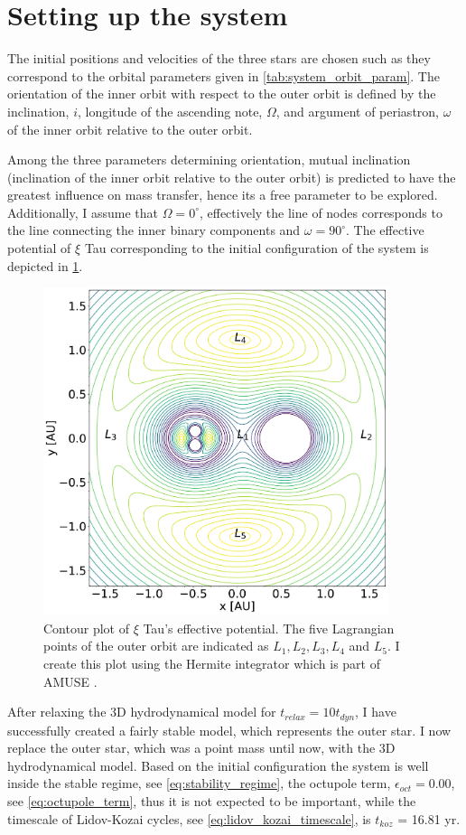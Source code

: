 \section{Setting up the system}

The initial positions and velocities of the three stars are chosen such as they correspond to the orbital parameters given in \cref{tab:system_orbit_param}. The orientation of the inner orbit with respect to the outer orbit is defined by the inclination, $i$, longitude of the ascending note, $\Omega$, and argument of periastron, $\omega$ of the inner orbit relative to the outer orbit.

Among the three parameters determining orientation, mutual inclination (inclination of the inner orbit relative to the outer orbit) is predicted to have the greatest influence on mass transfer, hence its a free parameter to be explored.  Additionally, I assume that  $\Omega=0^{\circ}$, effectively the line of nodes corresponds to the line connecting the inner binary components and $\omega= 90^{\circ}$. The effective potential of $\xi$ Tau corresponding to the initial configuration of the system is depicted in \cref{fig:triple_equop}.
\begin{figure}[H]
    \centering
    \includegraphics[width=0.9\textwidth]{Thesis/graphs/triple_equop.pdf}
    \caption{Contour plot of $\xi$ Tau's effective potential. The five Lagrangian points of the outer orbit are indicated as $L_1, L_2, L_3, L_4$ and $L_5$. I create this plot using the Hermite integrator which is part of  AMUSE \citep{hut1995building}.}
    \label{fig:triple_equop}
\end{figure}
After relaxing the 3D hydrodynamical model for $t_{relax} =10 t_{dyn}$, I have successfully created a fairly stable model, which represents the outer star. I now replace the outer star, which was a point mass until now, with the 3D hydrodynamical model. Based on the initial configuration the system is well inside the stable regime, see \cref{eq:stability_regime}, the octupole term, $\epsilon_{oct} = 0.00$, see \cref{eq:octupole_term}, thus it is not expected to be important, while the timescale of Lidov-Kozai cycles, see \cref{eq:lidov_kozai_timescale}, is $t_{koz}$ = 16.81 yr.